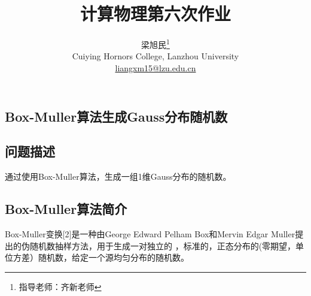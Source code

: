 \documentclass[twoside,twocolumn]{article}
\begin{document}
\begin{CJK*}{UTF8}{gkai}

\setlength{\droptitle}{-4\baselineskip} %
\pretitle{\begin{center}\Huge\bfseries} %
	\posttitle{\end{center}} %
\title{计算物理第六次作业} %
\author{
	\textsc{梁旭民}\thanks{\noindent 指导老师：齐新老师} \\[1ex] %
	\normalsize Cuiying Hornors College, Lanzhou University \\ %
	\normalsize \href{mailto:liangxm15@lzu.edu.cn}{liangxm15@lzu.edu.cn} %
}
\date{}
\renewcommand{\maketitlehookd}{
	\begin{abstract}
		本次作业学习了Box-Muller生成Gauss分布的方法及Gibbs采样法生成Gauss分布随机数的方法，并应用Box-Muller算法成功生成了一维Gauss分布的随机数，应用Gibbs采样法生成二维Gauss分布的随机数。
	\end{abstract}
}
\maketitle


\section{Box-Muller算法生成Gauss分布随机数}
	\subsection{问题描述}
		通过使用Box-Muller算法，生成一组1维Gauss分布的随机数。
	\subsection{Box-Muller算法简介}
	Box-Muller变换[2]是一种由George Edward Pelham Box和Mervin Edgar Muller提出的伪随机数抽样方法，用于生成一对独立的 ，标准的，正态分布的(零期望，单位方差）随机数，给定一个源均匀分布的随机数。

\end{CJK*}
\end{document}
